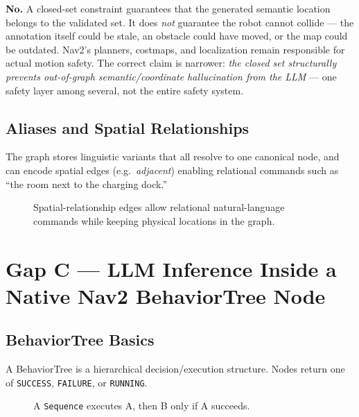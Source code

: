 \documentclass[11pt,a4paper]{article}
\newcommand{\gapbox}[2]{%
  \begin{tcolorbox}[colback=softblue,colframe=navyblue,title={#1},fonttitle=\bfseries,breakable]
  #2
  \end{tcolorbox}%
}
\begin{document}
\gapbox{Does the closed set guarantee physical safety?}{
\textbf{No.} A closed-set constraint guarantees that the generated semantic
location belongs to the validated set. It does \emph{not} guarantee the robot
cannot collide --- the annotation itself could be stale, an obstacle could have
moved, or the map could be outdated. Nav2's planners, costmaps, and
localization remain responsible for actual motion safety. The correct claim
is narrower: \emph{the closed set structurally prevents out-of-graph
semantic/coordinate hallucination from the LLM} --- one safety layer among
several, not the entire safety system.
}

\subsection{Aliases and Spatial Relationships}

The graph stores linguistic variants that all resolve to one canonical node,
and can encode spatial edges (e.g.\ \emph{adjacent}) enabling relational
commands such as ``the room next to the charging dock.''

\begin{figure}[h]
\centering
{}
\caption{Spatial-relationship edges allow relational natural-language commands while keeping physical locations in the graph.}
\end{figure}

\section{Gap C --- LLM Inference Inside a Native Nav2 BehaviorTree Node}
\label{sec:gapc}

\subsection{BehaviorTree Basics}

A BehaviorTree is a hierarchical decision/execution structure. Nodes return
one of \texttt{SUCCESS}, \texttt{FAILURE}, or \texttt{RUNNING}.

\begin{figure}[h]
\centering
{}
\caption{A \texttt{Sequence} executes A, then B only if A succeeds.}
\end{figure}
\end{document}
